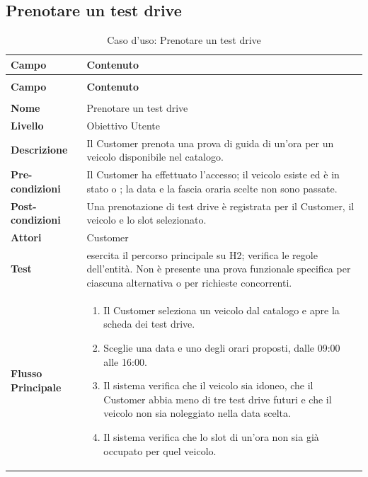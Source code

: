 \subsection{Prenotare un test drive}\label{sec:uc-test-drive}
\begin{xltabular}{\textwidth}{| >{\bfseries}p{.22\textwidth} | >{\raggedright\arraybackslash}X |}
\caption{Caso d'uso: Prenotare un test drive}\label{tab:uc-test-drive}\\
\hline
{} Campo & \textbf{Contenuto}\\\hline
\endfirsthead
{}\\
\hline
{} Campo & \textbf{Contenuto}\\\hline
\endhead
\hline
{}\\
\endfoot
\endlastfoot
Nome & Prenotare un test drive\\\hline
Livello & Obiettivo Utente\\\hline
Descrizione & Il Customer prenota una prova di guida di un'ora per un veicolo disponibile nel catalogo.\\\hline
Pre-condizioni & Il Customer ha effettuato l'accesso; il veicolo esiste ed è in stato  o ; la data e la fascia oraria scelte non sono passate.\\\hline
Post-condizioni & Una prenotazione di test drive è registrata per il Customer, il veicolo e lo slot selezionato.\\\hline
Attori & Customer\\\hline
Test &  esercita il percorso principale su H2;  verifica le regole dell'entità. Non è presente una prova funzionale specifica per ciascuna alternativa o per richieste concorrenti.\\\hline
Flusso Principale &
\begin{enumerate}[label=\arabic*.,start=1,leftmargin=*,nosep]
  \item Il Customer seleziona un veicolo dal catalogo e apre la scheda dei test drive.
  \item Sceglie una data e uno degli orari proposti, dalle 09:00 alle 16:00.
  \item Il sistema verifica che il veicolo sia idoneo, che il Customer abbia meno di tre test drive futuri e che il veicolo non sia noleggiato nella data scelta.
  \item Il sistema verifica che lo slot di un'ora non sia già occupato per quel veicolo.

\end{enumerate}
\end{xltabular}
